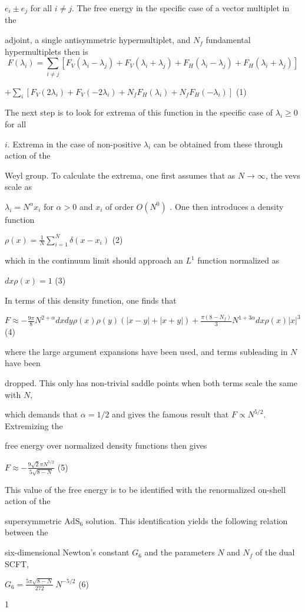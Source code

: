 \documentclass[a4paper,12pt]{article}
\begin{document}
$e_{i}\pm e_{j}$ for all $i \neq j$. The free energy in the specific case of a vector multiplet in the

adjoint, a single antisymmetric hypermultiplet, and $N_{f}$ fundamental hypermultiplets then is
$$
F(\lambda_{i})=\sum_{i\neq j}[F_{V}(\lambda_{i}-\lambda_{j})+F_{V}(\lambda_{i}+\lambda_{j})+F_{H}(\lambda_{i}-\lambda_{j})+F_{H}(\lambda_{i}+\lambda_{j})]
$$
\begin{center}
$+\displaystyle \sum_{i}[F_{V}(2\lambda_{i})+F_{V}(-2\lambda_{i})+N_{f}F_{H}(\lambda_{i})+N_{f}F_{H}(-\lambda_{i})]$   (1)
\end{center}
The next step is to look for extrema of this function in the specific case of $\lambda_{i} \geq 0$ for all

$i$. Extrema in the case of non-positive $\lambda_{i}$ can be obtained from these through action of the

Weyl group. To calculate the extrema, one first assumes that as $ N\rightarrow\infty$, the vevs scale as

$\lambda_{i}=N^{\alpha}x_{i}$ for $\alpha>0$ and $x_{i}$ of order $O(N^{0})$ . One then introduces a density function
\begin{center}
$\displaystyle \rho(x)=\frac{1}{N}\sum_{i=1}^{N}\delta(x-x_{i})$   (2)
\end{center}
which in the continuum limit should approach an $L^{1}$ function normalized as
\begin{center}
$dx\rho(x)=1$   (3)
\end{center}
In terms of this density function, one finds that

$F\displaystyle \approx-\frac{9\pi}{8}N^{2+\alpha} dxdy\displaystyle \rho(x)\rho(y)(|x-y|+|x+y|)+\frac{\pi(8-N_{f})}{3}N^{1+3\alpha} dx\rho(x)|x|^{3}$ (4)

where the large argument expansions have been used, and terms subleading in $N$ have been

dropped. This only has non-trivial saddle points when both terms scale the same with $N,$

which demands that $\alpha= 1/2$ and gives the famous result that $F\propto N^{5/2}$. Extremizing the

free energy over normalized density functions then gives
\begin{center}
$F\displaystyle \approx-\frac{9\sqrt{2}\pi N^{5/2}}{5\sqrt{8-N}}$   (5)
\end{center}
This value of the free energy is to be identified with the renormalized on-shell action of the

supersymmetric $\mathrm{A}\mathrm{d}\mathrm{S}_{6}$ solution. This identification yields the following relation between the

six-dimensional Newton's constant $G_{6}$ and the parameters $N$ and $N_{f}$ of the dual SCFT,
\begin{center}
$G_{6}=\displaystyle \frac{5\pi\sqrt{8-N}}{272}\ N^{-5/2}$   (6)
\end{center}
1
\end{document}
